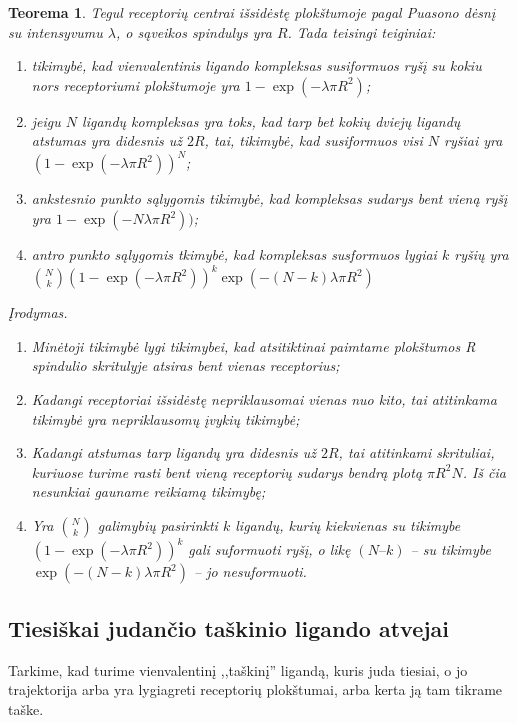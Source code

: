 \documentclass[10pt]{article}
\newtheorem{thm}{Teorema}
\begin{document}
\begin{thm}\label{thm:1}
Tegul receptorių centrai išsidėstę plokštumoje  pagal Puasono dėsnį su intensyvumu $\lambda$, o sąveikos spindulys yra $R$. Tada teisingi teiginiai:
\begin{enumerate}
	\item tikimybė, kad vienvalentinis ligando kompleksas susiformuos ryšį su kokiu nors receptoriumi plokštumoje yra $1-\exp(-\lambda \pi R^{2})$;
	\item jeigu $N$ ligandų kompleksas yra toks, kad tarp bet kokių dviejų ligandų atstumas  yra didesnis už $2R$, tai, tikimybė, kad susiformuos  visi $N$ ryšiai  yra $(1-\exp(-\lambda \pi R^{2}))^N$;
	\item ankstesnio punkto  sąlygomis  tikimybė, kad kompleksas  sudarys bent vieną ryšį yra 
	$1-\exp(-N \lambda \pi R^{2}))$;
	\item antro punkto sąlygomis tkimybė, kad kompleksas susformuos lygiai $k$ ryšių yra 
	 $ \binom{N}{k} \left( 1-\exp(-\lambda \pi R^{2}) \right) ^ k \exp(-(N-k) \lambda \pi R^{2})  $ 
	
	
	
\end{enumerate}
Įrodymas. 
\begin{enumerate}
\item  Minėtoji tikimybė lygi tikimybei, kad atsitiktinai paimtame plokštumos   R spindulio skritulyje atsiras bent vienas receptorius;
\item Kadangi receptoriai išsidėstę nepriklausomai vienas nuo kito, tai atitinkama tikimybė yra nepriklausomų įvykių tikimybė;
\item Kadangi atstumas tarp ligandų yra didesnis už $2R$, tai atitinkami skrituliai, kuriuose turime rasti bent vieną receptorių sudarys bendrą plotą $\pi R^2 N $. Iš čia nesunkiai gauname reikiamą tikimybę;
\item Yra  $\binom {N}{k}$ galimybių pasirinkti $k$ ligandų,  kurių kiekvienas su tikimybe $\left( 1-\exp(-\lambda \pi R^{2}) \right) ^ k$ gali suformuoti ryšį, o likę $( N – k )$ -- su tikimybe $\exp(-(N-k) \lambda \pi R^{2})$ -- jo nesuformuoti. 
\end{enumerate}


\end{thm}


\subsection{Tiesiškai judančio taškinio ligando atvejai}
Tarkime, kad turime vienvalentinį ,,taškinį'' ligandą, kuris juda tiesiai, o jo trajektorija arba yra lygiagreti receptorių plokštumai, arba kerta ją tam tikrame taške.
\end{document}
